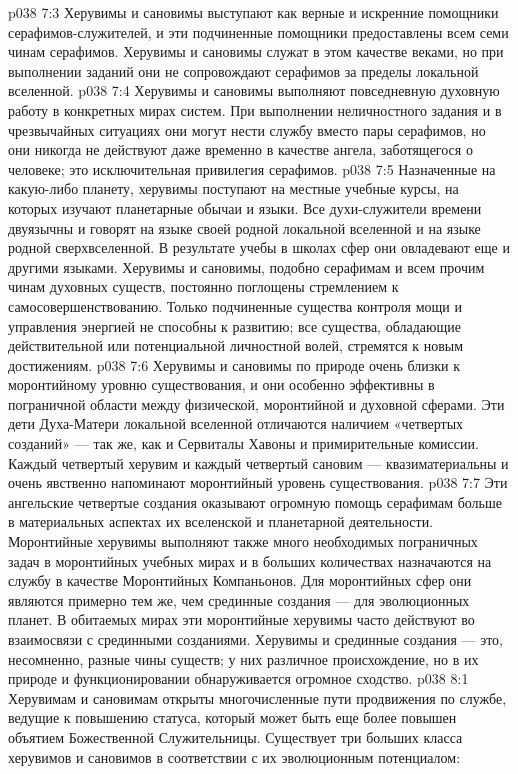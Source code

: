 \vs p038 7:3 \pc Херувимы и сановимы выступают как верные и искренние помощники серафимов\hyp{}служителей, и эти подчиненные помощники предоставлены всем семи чинам серафимов. Херувимы и сановимы служат в этом качестве веками, но при выполнении заданий они не сопровождают серафимов за пределы локальной вселенной.
\vs p038 7:4 Херувимы и сановимы выполняют повседневную духовную работу в конкретных мирах систем. При выполнении неличностного задания и в чрезвычайных ситуациях они могут нести службу вместо пары серафимов, но они никогда не действуют даже временно в качестве ангела, заботящегося о человеке; это исключительная привилегия серафимов.
\vs p038 7:5 \pc Назначенные на какую\hyp{}либо планету, херувимы поступают на местные учебные курсы, на которых изучают планетарные обычаи и языки. Все духи\hyp{}служители времени двуязычны и говорят на языке своей родной локальной вселенной и на языке родной сверхвселенной. В результате учебы в школах сфер они овладевают еще и другими языками. Херувимы и сановимы, подобно серафимам и всем прочим чинам духовных существ, постоянно поглощены стремлением к самосовершенствованию. Только подчиненные существа контроля мощи и управления энергией не способны к развитию; все существа, обладающие действительной или потенциальной личностной волей, стремятся к новым достижениям.
\vs p038 7:6 \pc Херувимы и сановимы по природе очень близки к моронтийному уровню существования, и они особенно эффективны в пограничной области между физической, моронтийной и духовной сферами. Эти дети Духа\hyp{}Матери локальной вселенной отличаются наличием «четвертых созданий» --- так же, как и Сервиталы Хавоны и примирительные комиссии. Каждый четвертый херувим и каждый четвертый сановим --- квазиматериальны и очень явственно напоминают моронтийный уровень существования.
\vs p038 7:7 Эти ангельские четвертые создания оказывают огромную помощь серафимам больше в материальных аспектах их вселенской и планетарной деятельности. Моронтийные херувимы выполняют также много необходимых пограничных задач в моронтийных учебных мирах и в больших количествах назначаются на службу в качестве Моронтийных Компаньонов. Для моронтийных сфер они являются примерно тем же, чем срединные создания --- для эволюционных планет. В обитаемых мирах эти моронтийные херувимы часто действуют во взаимосвязи с срединными созданиями. Херувимы и срединные создания --- это, несомненно, разные чины существ; у них различное происхождение, но в их природе и функционировании обнаруживается огромное сходство.
\vs p038 8:1 Херувимам и сановимам открыты многочисленные пути продвижения по службе, ведущие к повышению статуса, который может быть еще более повышен объятием Божественной Служительницы. Существует три больших класса херувимов и сановимов в соответствии с их эволюционным потенциалом:

